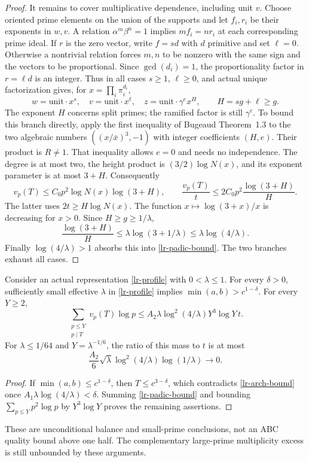 \begin{proof}
It remains to cover multiplicative dependence, including unit $v$.
Choose oriented prime elements on the union of the supports and let
$f_i,r_i$ be their exponents in $w,v$. A relation
$\alpha^m\beta^n=1$ implies $mf_i=nr_i$ at each corresponding prime
ideal. If $r$ is the zero vector, write $f=s d$ with $d$ primitive and
set $\ell=0$. Otherwise a nontrivial relation forces $m,n$ to be nonzero
with the same sign and the vectors to be proportional. Since
$\gcd(d_i)=1$, the proportionality factor in $r=\ell d$ is an integer.
Thus in all cases $s\ge1$, $\ell\ge0$, and actual unique factorization
gives, for $x=\prod_i\pi_i^{d_i}$,
\[
 w=\text{unit}\cdot x^s,\quad
 v=\text{unit}\cdot x^\ell,\quad
 z=\text{unit}\cdot\gamma^e x^H,\qquad H=sg+\ell\ge g.
\]
The exponent $H$ concerns split primes; the ramified factor is still
$\gamma^e$. To bound this branch directly, apply the first inequality of
Bugeaud Theorem~1.3 to the two algebraic numbers
$((x/\bar x)^3,-1)$ with integer coefficients $(H,e)$.
Their product is $R\ne1$. That inequality allows $e=0$ and needs no
independence. The degree is at most two, the height product is
$(3/2)\log N(x)$, and its exponent parameter is at most $3+H$.
Consequently
\[
 v_p(T)\le C_0 p^2\log N(x)\log(3+H),\qquad
 \frac{v_p(T)}t\le2C_0p^2\frac{\log(3+H)}H.
\]
The latter uses $2t\ge H\log N(x)$. The function
$x\mapsto\log(3+x)/x$ is decreasing for $x>0$. Since
$H\ge g\ge1/\lambda$,
\[
 \frac{\log(3+H)}H
 \le\lambda\log(3+1/\lambda)
 \le\lambda\log(4/\lambda).
\]
Finally $\log(4/\lambda)>1$ absorbs this into
\eqref{lr-padic-bound}. The two branches exhaust all cases.
\end{proof}

\begin{corollary}\label{lr-balance}
Consider an actual representation \eqref{lr-profile} with $0<\lambda\le1$.
For every $\delta>0$, sufficiently small effective $\lambda$ in
\eqref{lr-profile} implies $\min(a,b)>c^{1-\delta}$. For every $Y\ge2$,
\begin{equation}\label{lr-small-mass}
 \sum_{\substack{p\le Y\\p\mid T}}v_p(T)\log p
 \le A_2\lambda\log^2(4/\lambda)Y^3\log Y\,t.
\end{equation}
For $\lambda\le1/64$ and $Y=\lambda^{-1/6}$, the ratio of this mass to
$t$ is at most
\[
 \frac{A_2}{6}\sqrt\lambda\log^2(4/\lambda)\log(1/\lambda)
 \longrightarrow0.
\]
\end{corollary}
\begin{proof}
If $\min(a,b)\le c^{1-\delta}$, then $T\le c^{3-\delta}$, which
contradicts \eqref{lr-arch-bound} once
$A_1\lambda\log(4/\lambda)<\delta$. Summing
\eqref{lr-padic-bound} and bounding $\sum_{p\le Y}p^2\log p$ by
$Y^3\log Y$ proves the remaining assertions.
\end{proof}
These are unconditional balance and small-prime conclusions, not an ABC
quality bound above one half. The complementary large-prime multiplicity
excess is still unbounded by these arguments.

